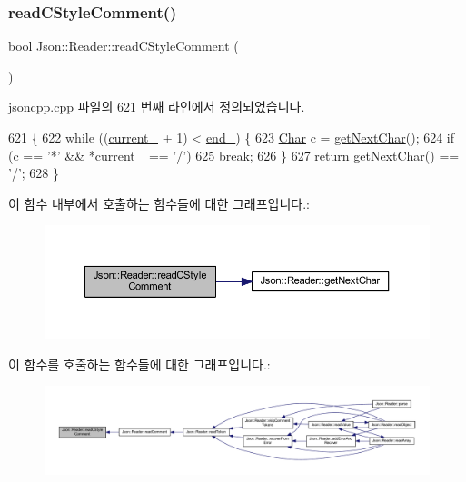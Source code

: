 \subsubsection{\texorpdfstring{read\+C\+Style\+Comment()}{readCStyleComment()}}
{\footnotesize\ttfamily bool Json\+::\+Reader\+::read\+C\+Style\+Comment (\begin{DoxyParamCaption}{ }\end{DoxyParamCaption})\hspace{0.3cm}{\ttfamily [private]}}



jsoncpp.\+cpp 파일의 621 번째 라인에서 정의되었습니다.


\begin{DoxyCode}
621                                \{
622   \textcolor{keywordflow}{while} ((\hyperlink{class_json_1_1_reader_a2f2feb5201a26da7aa133d2f7434479b}{current\_} + 1) < \hyperlink{class_json_1_1_reader_a714793579cbf4ee7c5a7223d2c8d77c1}{end\_}) \{
623     \hyperlink{class_json_1_1_reader_a3eec9118f3e9a672ba8348c3a79d0f45}{Char} c = \hyperlink{class_json_1_1_reader_ab61eb61333cc9ec3afe785663a53ce90}{getNextChar}();
624     \textcolor{keywordflow}{if} (c == \textcolor{charliteral}{'*'} && *\hyperlink{class_json_1_1_reader_a2f2feb5201a26da7aa133d2f7434479b}{current\_} == \textcolor{charliteral}{'/'})
625       \textcolor{keywordflow}{break};
626   \}
627   \textcolor{keywordflow}{return} \hyperlink{class_json_1_1_reader_ab61eb61333cc9ec3afe785663a53ce90}{getNextChar}() == \textcolor{charliteral}{'/'};
628 \}
\end{DoxyCode}
이 함수 내부에서 호출하는 함수들에 대한 그래프입니다.\+:\nopagebreak
\begin{figure}[H]
\begin{center}
\leavevmode
\includegraphics[width=350pt]{class_json_1_1_reader_ae0ffe796abdc3c5851589ee500e28c79_cgraph}
\end{center}
\end{figure}
이 함수를 호출하는 함수들에 대한 그래프입니다.\+:\nopagebreak
\begin{figure}[H]
\begin{center}
\leavevmode
\includegraphics[width=350pt]{class_json_1_1_reader_ae0ffe796abdc3c5851589ee500e28c79_icgraph}
\end{center}
\end{figure}
